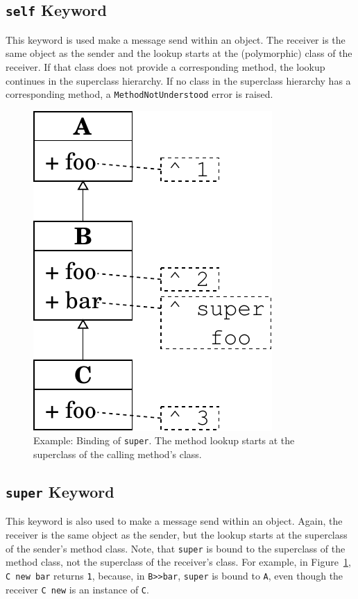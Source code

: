 \subsection{\texttt{self} Keyword}
This keyword is used make a message send within an object. The receiver is the same object as the sender and the lookup starts at the (polymorphic) class of the receiver. If that class does not provide a corresponding method, the lookup continues in the superclass hierarchy. If no class in the superclass hierarchy has a corresponding method, a \texttt{MethodNotUnderstood} error is raised.

\begin{figure}
	\includegraphics[scale=0.75]{super_binding.pdf}
	\centering
	\caption[Example: Binding of \texttt{super}]{Example: Binding of \texttt{super}. The method lookup starts at the superclass of the calling method's class.}
	\label{fig:concept_super_binding}
\end{figure}

\subsection{\texttt{super} Keyword}
This keyword is also used to make a message send within an object. Again, the receiver is the same object as the sender, but the lookup starts at the superclass of the sender's method class. Note, that \texttt{super} is bound to the superclass of the method class, not the superclass of the receiver's class. For example, in Figure~\ref{fig:concept_super_binding}, \texttt{C new bar} returns \texttt{1}, because, in \texttt{B>>bar}, \texttt{super} is bound to \texttt{A}, even though the receiver \texttt{C new} is an instance of \texttt{C}.

